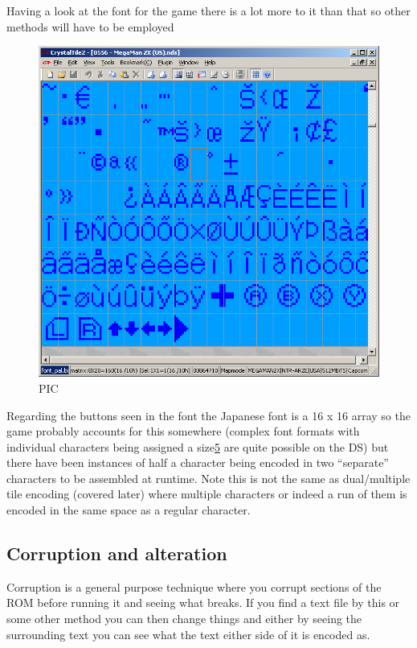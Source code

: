 \documentclass[
]{book}
\begin{document}
Having a look at the font for the game there is a lot more to it than that so other methods will have to be employed

\begin{figure}
\centering
\includegraphics{images/88_home_fast6191_romhackingguide_unrenamed_file___rs_romhackingguiderelativesearchfontviewing.png}
\caption{PIC}
\end{figure}

Regarding the buttons seen in the font the Japanese font is a 16 x 16 array so the game probably accounts for this somewhere (complex font formats with individual characters being assigned a size\href{romhacking20206.html\#fn5x0}{5} are quite possible on the DS) but there have been instances of half a character being encoded in two ``separate'' characters to be assembled at runtime. Note this is not the same as dual/multiple tile encoding (covered later) where multiple characters or indeed a run of them is encoded in the same space as a regular character.

\hypertarget{corruption-and-alteration}{%
\subsection{Corruption and alteration}\label{corruption-and-alteration}}

Corruption is a general purpose technique where you corrupt sections of the ROM before running it and seeing what breaks. If you find a text file by this or some other method you can then change things and either by seeing the surrounding text you can see what the text either side of it is encoded as.
\end{document}
